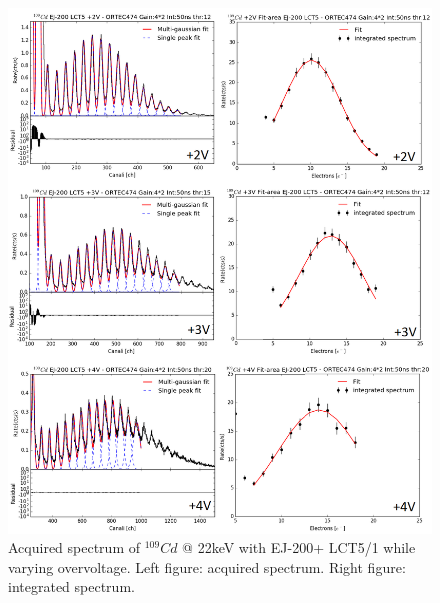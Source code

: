 \documentclass[10pt,a4paper, openany]{book}
\begin{document}
\begin{figure}[!h]
\begin{center}
\includegraphics[scale=0.35]{imm/ej200_fit.png}
\end{center}
\caption{Acquired spectrum of $^{109}Cd$ @ 22keV with EJ-200+ LCT5/1 while varying overvoltage. Left figure: acquired spectrum. Right figure: integrated spectrum.} 
\label{fig:ej200_fit}
\end{figure}
\end{document}
